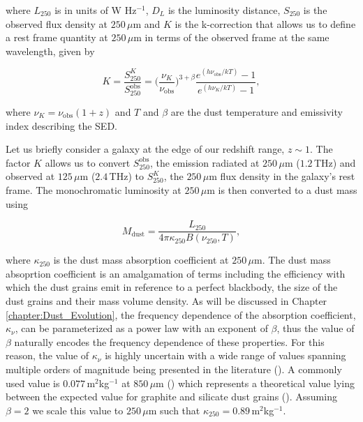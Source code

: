 \noindent where $L_{250}$ is in units of W Hz$^{-1}$, $D_L$ is the luminosity distance, $S_{250}$ is the observed flux density at $250\,\mu$m and $K$ is the k-correction that allows us to define a rest frame quantity at $250\,\mu$m in terms of the observed frame at the same wavelength, given by

\begin{equation}
    K = \frac{S_{250}^{K}}{S_{250}^{\textrm{obs}}} = \Bigg(\frac{\nu_{K}}{\nu_{\textrm{obs}}}\Bigg)^{3+\beta}\frac{e^{(h\nu_{\textrm{obs}}/kT)} - 1}{e^{(h\nu_{K}/kT)} - 1},
\label{eq:k_correction}
\end{equation}

\noindent where $\nu_{K} = \nu_{\textrm{obs}}(1+z)$ and $T$ and $\beta$ are the dust temperature and emissivity index describing the SED. 

Let us briefly consider a galaxy at the edge of our redshift range, $z \sim 1$. The factor $K$ allows us to convert $S_{250}^{\textrm{obs}}$, the emission radiated at $250\,\mu$m ($1.2\,$THz) and observed at $125\,\mu$m ($2.4\,$THz) to $S_{250}^{K}$, the $250\,\mu$m flux density in the galaxy's rest frame. The monochromatic luminosity at $250\,\mu$m is then converted to a dust mass using

\begin{equation}
    M_{\textrm{dust}} = \frac{L_{250}}{4\pi\kappa_{250}B(\nu_{250}, T)},
\label{fig:dust_mass}
\end{equation}

\noindent where $\kappa_{250}$ is the dust mass absorption coefficient at $250\,\mu$m. The dust mass absoprtion coefficient is an amalgamation of terms including the efficiency with which the dust grains emit in reference to a perfect blackbody, the size of the dust grains and their mass volume density. As will be discussed in Chapter \ref{chapter:Dust_Evolution}, the frequency dependence of the absorption coefficient, $\kappa_\nu$, can be parameterized as a power law with an exponent of $\beta$, thus the value of $\beta$ naturally encodes the frequency dependence of these properties. For this reason, the value of $\kappa_\nu$ is highly uncertain with a wide range of values spanning multiple orders of magnitude being presented in the literature (\citealt{Clark_2019}). A commonly used value is $0.077\,$m$^2$kg$^{-1}$ at $850\,\mu$m (\citealt{Dunne_2000, daCunha_2008, Dunne_2011}) which represents a theoretical value lying between the expected value for graphite and silicate dust grains (\citealt{Draine_1984}). Assuming $\beta = 2$ we scale this value to $250\,\mu$m such that $\kappa_{250} = 0.89\,$m$^2$kg$^{-1}$.

